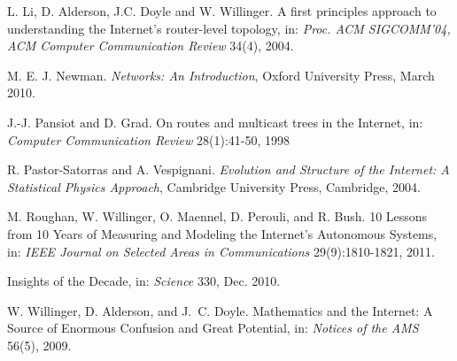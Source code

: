 \documentclass{sig-alternate-10pt}
\begin{document}
{\begin{thebibliography}{99}
L. Li, D. Alderson, J.C. Doyle and W. Willinger. A first principles approach to understanding the Internet's router-level topology, in: {\em Proc. ACM SIGCOMM'04, ACM Computer Communication Review} 34(4), 2004.

M. E. J. Newman. {\em Networks: An Introduction}, Oxford University Press, March 2010.

J.-J. Pansiot and D. Grad. On routes and multicast trees in the Internet, in: {\em  Computer Communication Review} 28(1):41-50, 1998

R. Pastor-Satorras and A. Vespignani. {\em Evolution and Structure of the Internet: A Statistical Physics Approach}, Cambridge University Press, Cambridge, 2004.
   
M. Roughan, W. Willinger, O. Maennel, D. Perouli, and R. Bush. 10 Lessons from 10 Years of Measuring and Modeling the Internet's Autonomous Systems, in: {\em IEEE Journal on Selected Areas in Communications} 29(9):1810-1821, 2011.

Insights of the Decade, in: {\em Science} 330, Dec. 2010.

W. Willinger, D. Alderson, and J.~C. Doyle. Mathematics and the Internet: A Source of Enormous Confusion and Great Potential, 
in: {\em Notices of the AMS} 56(5), 2009.

\end{thebibliography}
}
\end{document}
